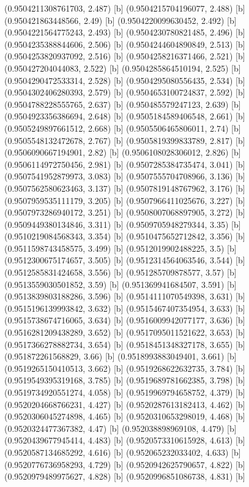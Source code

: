 {{{(0.9504211308761703, 2.487) [b] 
(0.9504215704196077, 2.488) [b] 
(0.950421863448566, 2.49) [b] 
(0.9504220099630452, 2.492) [b] 
(0.9504221564775243, 2.493) [b] 
(0.9504230780821485, 2.496) [b] 
(0.9504235388844606, 2.506) [b] 
(0.9504244604890849, 2.513) [b] 
(0.9504253820937092, 2.516) [b] 
(0.9504258216371466, 2.521) [b] 
(0.950427204044083, 2.522) [b] 
(0.9504285864510194, 2.525) [b] 
(0.9504290472533314, 2.528) [b] 
(0.9504295080556435, 2.534) [b] 
(0.9504302406280393, 2.579) [b] 
(0.9504653100724837, 2.592) [b] 
(0.9504788228555765, 2.637) [b] 
(0.950485579247123, 2.639) [b] 
(0.9504923356386694, 2.648) [b] 
(0.9505184589406548, 2.661) [b] 
(0.9505249897661512, 2.668) [b] 
(0.9505506465806011, 2.74) [b] 
(0.9505548132472678, 2.767) [b] 
(0.9505819399833789, 2.817) [b] 
(0.9506090667194901, 2.82) [b] 
(0.9506108028306012, 2.826) [b] 
(0.9506114972750456, 2.981) [b] 
(0.9507285384735474, 3.041) [b] 
(0.9507541952879973, 3.083) [b] 
(0.9507555704708966, 3.136) [b] 
(0.9507562580623463, 3.137) [b] 
(0.9507819148767962, 3.176) [b] 
(0.9507959535111179, 3.205) [b] 
(0.9507966411025676, 3.227) [b] 
(0.9507973286940172, 3.251) [b] 
(0.9508007068897905, 3.272) [b] 
(0.9509449380134846, 3.311) [b] 
(0.9509705948279344, 3.35) [b] 
(0.9510219084568343, 3.354) [b] 
(0.9510475652712842, 3.356) [b] 
(0.9511598743458575, 3.499) [b] 
(0.9512019902488225, 3.5) [b] 
(0.9512300675174657, 3.505) [b] 
(0.9512314564063546, 3.544) [b] 
(0.9512585831424658, 3.556) [b] 
(0.951285709878577, 3.57) [b] 
(0.9513559030501852, 3.59) [b] 
(0.951369941684507, 3.591) [b] 
(0.9513839803188286, 3.596) [b] 
(0.9514111070549398, 3.631) [b] 
(0.9515196139993842, 3.632) [b] 
(0.9515467407354954, 3.633) [b] 
(0.9515738674716065, 3.634) [b] 
(0.9516009942077177, 3.636) [b] 
(0.9516281209438289, 3.652) [b] 
(0.9517095011521622, 3.653) [b] 
(0.9517366278882734, 3.654) [b] 
(0.9518451348327178, 3.655) [b] 
(0.951872261568829, 3.66) [b] 
(0.9518993883049401, 3.661) [b] 
(0.9519265150410513, 3.662) [b] 
(0.9519268622632735, 3.784) [b] 
(0.9519549395319168, 3.785) [b] 
(0.9519689781662385, 3.798) [b] 
(0.9519734920551274, 4.058) [b] 
(0.9519969794658752, 4.379) [b] 
(0.9520204668766231, 4.427) [b] 
(0.9520287613182413, 4.462) [b] 
(0.9520306045274898, 4.465) [b] 
(0.9520310653298019, 4.468) [b] 
(0.9520324477367382, 4.47) [b] 
(0.952038898969108, 4.479) [b] 
(0.9520439677945414, 4.483) [b] 
(0.9520573310615928, 4.613) [b] 
(0.9520587134685292, 4.616) [b] 
(0.952065232033402, 4.633) [b] 
(0.9520776736958293, 4.729) [b] 
(0.9520942625790657, 4.822) [b] 
(0.9520979489975627, 4.828) [b] 
(0.9520996851086738, 4.831) [b] 
}}}
